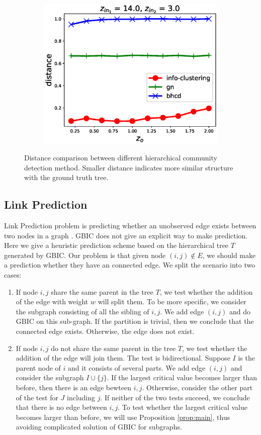 \begin{figure}
\begin{subfigure}{0.33\textwidth}
		\includegraphics[width=\textwidth]{pic/z_o.eps}
		\caption{}
	\end{subfigure}
	\caption{Distance comparison between different hierarchical community detection method. Smaller distance indicates more similar structure with the ground truth tree.}\label{fig:cdr}	
\end{figure}
\subsection{Link Prediction}
Link Prediction problem is predicting whether an unobserved edge exists between two nodes in a graph \citep{liben2007link}.  GBIC does not give an explicit way to make prediction. Here we give a heuristic prediction scheme based on the hierarchical tree $T$ generated by GBIC.
Our problem is that given node $(i,j) \not\in E$, we should make a prediction whether they have an connected edge. We split the scenario 
into two cases:
\begin{enumerate}
\item If node $i,j$ share the same parent in the tree $T$, we test whether the addition of the edge with weight $w$ will split them. To be more specific, we consider the subgraph consisting of all the sibling of $i,j$. We add edge $(i,j)$ and do GBIC on this sub-graph. If the partition is trivial, then we conclude that the connected edge exists. Otherwise, the edge does not exist.

\item If node $i,j$ do not share the same parent in the tree $T$, we test whether the addition of the edge will join them. The test is bidirectional. Suppose $I$ is the parent node of $i$ and it consists of several parts. We add edge $(i,j)$ and consider the subgraph $I \cup \{j\}$. If the largest critical value becomes larger than before, then there is an edge bewteen $i,j$. Otherwise, consider the other part of the test for $J$ including $j$. If neither of the two tests succeed, we conclude that there is no edge between $i,j$. To test whether the largest critical value becomes larger than before, we will use Proposition \ref{prop:main},  thus avoiding complicated solution of GBIC for subgraphs.
\end{enumerate}

